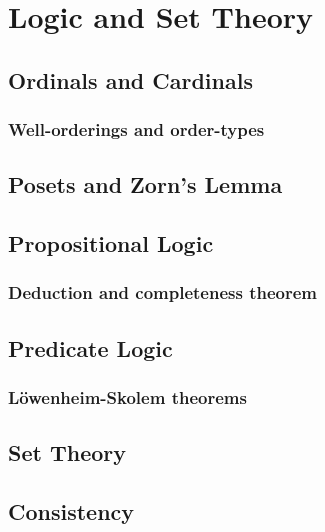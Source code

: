 \documentclass[main.tex]{subfiles}
\begin{document}
	\chapter{Logic and Set Theory}
		\section{Ordinals and Cardinals}
			\subsection{Well-orderings and order-types}
			
		\section{Posets and Zorn's Lemma}
		
		\section{Propositional Logic}
		\subsection{Deduction and completeness theorem}
		\section{Predicate Logic}
		\subsection{L\"{o}wenheim-Skolem theorems}
		
		\section{Set Theory}
		
		\section{Consistency}		
\end{document}
